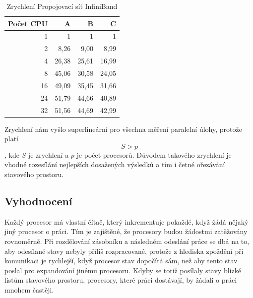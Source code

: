 \documentclass[12pt]{article}
\begin{document}
\begin{table}[H]
\begin{center}
\begin{tabular}{|r|r|r|r|}
\hline
Počet CPU & A & B & C\\
\hline
1 & 1 & 1 & 1\\
\hline
2 & 8,26 & 9,00 & 8,99\\
\hline
4 & 26,38 & 25,61 & 16,99\\
\hline
8 & 45,06 & 30,58 & 24,05\\
\hline
16 & 49,09 & 35,45 & 31,66\\
\hline
24 & 51,79 & 44,66 & 40,89\\
\hline
32 & 51,56 & 44,69 & 42,99\\
\hline
\end{tabular} 
\end{center}
\caption{Zrychlení Propojovací síť InfiniBand}
\end{table}
Zrychlení nám vyšlo superlineární pro všechna měření paralelní úlohy, 
protože platí $$S > p$$, kde \(S\) je zrychlení a \(p\) je počet procesorů. Důvodem takového zrychlení je vhodné rozesílání
nejlepších dosažených výsledků a tím i četné ořezávání stavového prostoru.

\subsection{Vyhodnocení}
Každý procesor má vlastní čítač, který inkrementuje pokaždé, když žádá nějaký jiný procesor o práci. Tím je zajištěné,
že procesory budou žádostmi zatěžovány rovnoměrně. Při rozdělování zásobníku a následném odeslání práce se dbá na to,
aby odesílané stavy nebyly příliš rozpracované, protože z hlediska zpoždění při komunikaci je rychlejší, když procesor
stav dopočítá sám, než aby tento stav poslal pro expandování jinému procesoru. Kdyby se totiž posílaly stavy blízké
listům stavového prostoru, procesory, které práci dostávají, by žádali o práci mnohem častěji.

\end{document}
